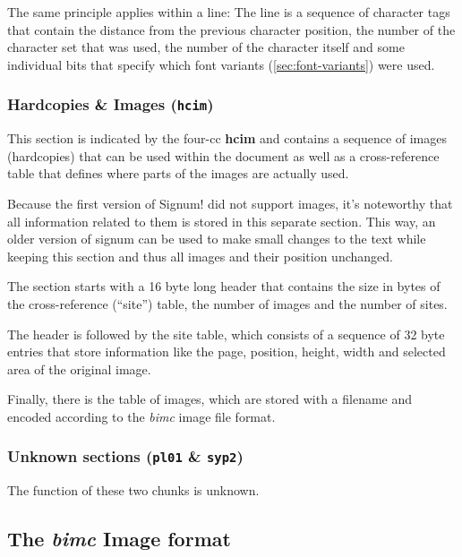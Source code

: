The same principle applies within a line: The line is a sequence of character tags that contain the distance from the previous character position, the number of the character set that was used, the number of the character itself and some individual bits that specify which font variants (\ref{sec:font-variants}) were used.

\subsubsection{Hardcopies \& Images (\texttt{hcim})}
\label{sec:sdoc_hcim}

This section is indicated by the \acrshort{four-cc} \textbf{hcim} and contains a sequence of images (hardcopies) that can be used within the document as well as a cross-reference table that defines where parts of the images are actually used.

Because the first version of Signum! did not support images, it's noteworthy that all information related to them is stored in this separate section. This way, an older version of signum can be used to make small changes to the text while keeping this section and thus all images and their position unchanged.

The section starts with a 16 \gls{byte} long header that contains the size in \glspl{byte} of the cross-reference (``site'') table, the number of images and the number of sites.

The header is followed by the site table, which consists of a sequence of 32 \gls{byte} entries that store information like the page, position, height, width and selected area of the original image.

Finally, there is the table of images, which are stored with a filename and encoded according to the \textit{bimc} image file format.

\subsubsection{Unknown sections (\texttt{pl01} \& \texttt{syp2})}
The function of these two chunks is unknown.

\subsection{The \textit{bimc} Image format}

\newcommand{\fboxinclude}[1]{\fbox{\texttt{[image: \#1]}}}
\newcommand{\chk}[1]{\fbox{\makebox(20,20){#1}}}
\newcommand{\chdots}{\makebox(28,26){$\dots$}}
\newcommand{\cvdots}{\makebox(28,26){$\vdots$}}
\newcommand{\cmid}{\makebox(28,26){}}

